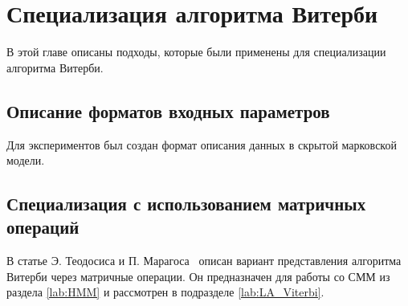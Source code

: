 \section{Специализация алгоритма Витерби}
В этой главе описаны подходы, которые были применены для 
специализации алгоритма Витерби.

\subsection{Описание форматов входных параметров}
Для экспериментов был создан формат описания данных в скрытой марковской модели.

\subsection{Специализация с использованием матричных\\ операций}
\label{lab:LA_spec}
В статье Э. Теодосиса и П. Марагоса~\cite{LA_Viterbi} описан 
вариант представления алгоритма Витерби через матричные 
операции.
Он предназначен для работы со СММ из раздела 
\ref{lab:HMM} и рассмотрен в подразделе 
\ref{lab:LA_Viterbi}.

